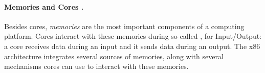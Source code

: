 %

\paragraph{Memories and Cores \IOs.}
%
Besides cores, \emph{memories} are the most important components of a computing
platform.
%
Cores interact with these memories during so-called \IOs, for Input/Output: a
core receives data during an input and it sends data during an output.
%
The x86 architecture integrates several sources of memories, along with several
mechanisms cores can use to interact with these memories.

